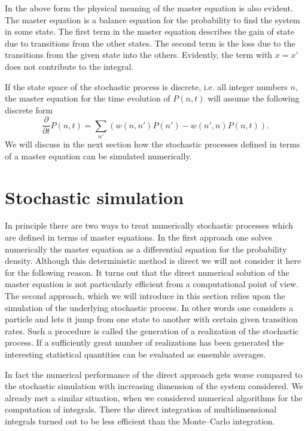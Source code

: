 In the above form the physical meaning of the master equation is 
also evident. The master equation is a balance equation for the
probability to find the system in some state. The first term in 
the master equation describes the gain of state due to transitions 
from the other states. The second term is the loss due to the 
transitions from the given state into the others. Evidently,
the term with $x=x'$ does not contribute to the integral.

If the state space of the stochastic process is discrete, i.e.
all integer numbers $n$,
the master equation for the time evolution of $P(n,t)$ will assume 
the following discrete form
\begin{equation}
\label{MASTER_JUMP_P_N}
\frac{\partial}{\partial t} P(n,t) =
 \sum_{n'} \left( w(n,n') P(n')
 - w(n',n) P(n,t) \right).
\end{equation}
We will discuss in the next section how the stochastic processes 
defined in terms of a master equation can be simulated 
numerically.


\section{Stochastic simulation}
In principle there are two ways to treat numerically
stochastic processes which are defined in terms of master
equations. In the first approach one solves numerically the
master equation as a differential equation for the probability
density. Although this deterministic method is direct we will not consider it 
here for the following reason. It  turns out that the direct 
numerical solution of the master equation is not particularly 
efficient from a computational point of view. The second approach,
which we will introduce in this section relies upon the simulation 
of the underlying stochastic process. In other words one considers 
a particle and lets it jump from one state to another with certain 
given transition rates. Such a procedure is called the generation 
of a realization of the stochastic process. If a sufficiently 
great number of realizations has been generated the interesting 
statistical quantities can be evaluated as ensemble averages.

In fact the numerical performance of the direct approach gets 
worse compared to the stochastic simulation with increasing 
dimension of the system considered. We already met a similar 
situation, when we considered numerical algorithms for the 
computation of integrals. There the direct integration of 
multidimensional integrals turned out to be less efficient than 
the Monte--Carlo integration.

